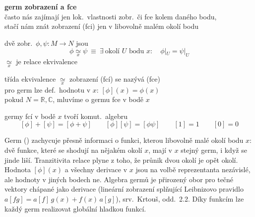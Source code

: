 \textbf{germ zobrazení a fce} \\
\quad často nás zajímají jen lok.\ vlastnosti zobr.\ či fce kolem daného bodu, \\
\quad stačí nám znát zobrazení (fci) jen v libovolně malém okolí bodu

\begin{definice}
dvě zobr.\ $\phi,\psi: M\to N$ jsou 
\[ \phi\underset{x}{\simeq}\psi \ \equiv\ \exists\ \text{okolí } U \text{ bodu } x:\quad \phi|_U = \psi|_U \]
$\underset{x}{\simeq}$ je relace ekvivalence
\end{definice}

\begin{definice}[Germ]
třída ekvivalence $\underset{x}{\simeq}$ zobrazení (fcí) se nazývá  (fce) \\
pro germ lze def.\ hodnotu v $x$: \quad $[\phi](x) = \phi(x)$ \\
pokud $N = \mathbb{R},\mathbb{C}$, mluvíme o germu fce v bodě $x$
\end{definice}

germy fcí v bodě $x$ tvoří komut.\ algebru
\[ [\phi] + [\psi] = [\phi + \psi] \qquad [\phi][\psi] = [\phi\psi] \qquad [1] = 1 \qquad [0] = 0 \]

\begin{vysvetleni}[Germy]
Germ () zachycuje přesně informaci o funkci, kterou  libovolně malé okolí bodu $x$: dvě funkce, které se shodují na nějakém okolí $x$, mají v $x$ stejný germ, i když se jinde liší. Tranzitivita relace plyne z toho, že průnik dvou okolí je opět okolí. Hodnota $[\phi](x)$ a všechny derivace v $x$ jsou na volbě reprezentanta nezávislé, ale hodnoty v jiných bodech ne. Algebra germů je přirozený obor pro tečné vektory chápané jako derivace (lineární zobrazení splňující Leibnizovo pravidlo $a[fg]=a[f]\,g(x)+f(x)\,a[g]$), srv.\ Krtouš, odd.~2.2. Díky  funkcím lze každý germ realizovat globální hladkou funkcí.
\end{vysvetleni}
